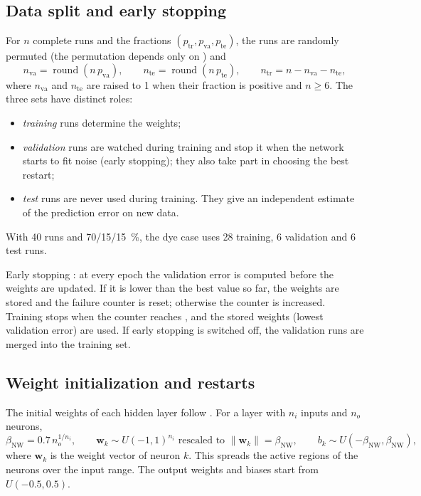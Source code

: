 \subsection{Data split and early stopping}\label{sec:ch07-split}

For $n$ complete runs and the fractions $(p_\text{tr}, p_\text{va}, p_\text{te})$, the runs are randomly permuted
(the permutation depends only on ) and
\begin{equation}
  n_\text{va} = \operatorname{round}(n\,p_\text{va}),\qquad n_\text{te} = \operatorname{round}(n\,p_\text{te}),
  \qquad n_\text{tr} = n - n_\text{va} - n_\text{te}, \label{eq:ch07-split}
\end{equation}
where $n_\text{va}$ and $n_\text{te}$ are raised to 1 when their fraction is positive and $n \ge 6$. The three
sets have distinct roles:
\begin{itemize}
  \item \emph{training} runs determine the weights;
  \item \emph{validation} runs are watched during training and stop it when the network starts to fit noise
    (early stopping); they also take part in choosing the best restart;
  \item \emph{test} runs are never used during training. They give an independent estimate of the prediction
    error on new data.
\end{itemize}
With 40 runs and 70/15/15~\%, the dye case uses 28 training, 6 validation and 6 test runs.

Early stopping \citep{prechelt1998}: at every epoch the validation error is computed before the weights are
updated. If it is lower than the best value so far, the weights are stored and the failure counter is reset;
otherwise the counter is increased. Training stops when the counter reaches , and the
stored weights (lowest validation error) are used. If early stopping is switched off, the validation runs are
merged into the training set.

\subsection{Weight initialization and restarts}

The initial weights of each hidden layer follow \citet{nguyen1990}. For a layer with $n_i$ inputs and $n_o$
neurons,
\begin{equation}
  \beta_\text{NW} = 0.7\,n_o^{1/n_i}, \qquad
  \mathbf{w}_k \sim U(-1,1)^{n_i} \text{ rescaled to } \|\mathbf{w}_k\| = \beta_\text{NW}, \qquad
  b_k \sim U(-\beta_\text{NW}, \beta_\text{NW}), \label{eq:ch07-nw}
\end{equation}
where $\mathbf{w}_k$ is the weight vector of neuron $k$. This spreads the active regions of the neurons over the
input range. The output weights and biases start from $U(-0.5, 0.5)$.

